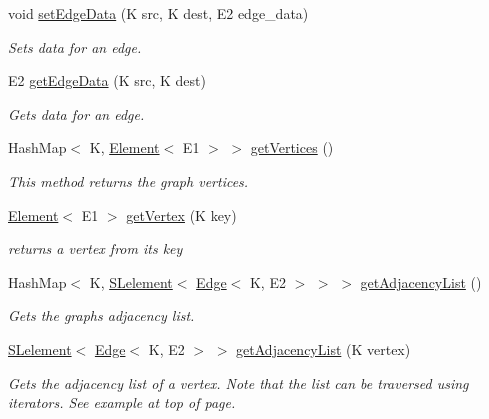 \begin{DoxyCompactItemize}
void \hyperlink{classbridges_1_1base_1_1_graph_adj_list_a48041b13b10d5fb677f48a0debfc268e}{set\+Edge\+Data} (K src, K dest, E2 edge\+\_\+data)
\begin{DoxyCompactList}\small\item\em Sets data for an edge. \end{DoxyCompactList}\item 
E2 \hyperlink{classbridges_1_1base_1_1_graph_adj_list_a13cdc7ed89fb211f47e2b04da0b65561}{get\+Edge\+Data} (K src, K dest)
\begin{DoxyCompactList}\small\item\em Gets data for an edge. \end{DoxyCompactList}\item 
Hash\+Map$<$ K, \hyperlink{classbridges_1_1base_1_1_element}{Element}$<$ E1 $>$ $>$ \hyperlink{classbridges_1_1base_1_1_graph_adj_list_acd53b2393db0936ad5812997f67ee1ee}{get\+Vertices} ()
\begin{DoxyCompactList}\small\item\em This method returns the graph vertices. \end{DoxyCompactList}\item 
\hyperlink{classbridges_1_1base_1_1_element}{Element}$<$ E1 $>$ \hyperlink{classbridges_1_1base_1_1_graph_adj_list_aa19cd300a85b05352bdf58720310a112}{get\+Vertex} (K key)
\begin{DoxyCompactList}\small\item\em returns a vertex from its key \end{DoxyCompactList}\item 
Hash\+Map$<$ K, \hyperlink{classbridges_1_1base_1_1_s_lelement}{S\+Lelement}$<$ \hyperlink{classbridges_1_1base_1_1_edge}{Edge}$<$ K, E2 $>$ $>$ $>$ \hyperlink{classbridges_1_1base_1_1_graph_adj_list_a77771e356aa8bf44525be9ae01603989}{get\+Adjacency\+List} ()
\begin{DoxyCompactList}\small\item\em Gets the graph\textquotesingle{}s adjacency list. \end{DoxyCompactList}\item 
\hyperlink{classbridges_1_1base_1_1_s_lelement}{S\+Lelement}$<$ \hyperlink{classbridges_1_1base_1_1_edge}{Edge}$<$ K, E2 $>$ $>$ \hyperlink{classbridges_1_1base_1_1_graph_adj_list_aa8d25bc56b9a172999f0c62ee7e04b6f}{get\+Adjacency\+List} (K vertex)
\begin{DoxyCompactList}\small\item\em Gets the adjacency list of a vertex. Note that the list can be traversed using iterators. See example at top of page. \end{DoxyCompactList}\item 

\end{DoxyCompactItemize}
